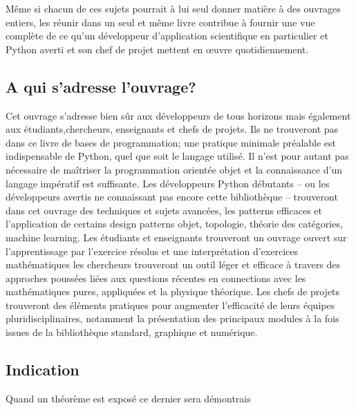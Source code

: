 Même si chacun de ces sujets pourrait à lui seul donner matière à des ouvrages entiers, les réunir dans 
un seul et même livre contribue à fournir une vue complète de ce qu’un développeur d'application 
scientifique en particulier et Python averti et son chef de projet mettent en œuvre quotidiennement.

\subsection*{A qui s'adresse l'ouvrage?}
Cet ouvrage s’adresse bien sûr aux développeurs de tous horizons mais également aux
étudiants,chercheurs, enseignants et chefs de projets. Ils ne trouveront pas dans ce livre de bases de 
programmation; une pratique minimale préalable est indispensable de Python, quel que soit le langage 
utilisé. Il n’est pour autant pas nécessaire de maîtriser la programmation orientée objet et 
la connaissance d’un langage impératif est suffisante.
Les développeurs Python débutants – ou les développeurs avertis ne connaissant pas
encore cette bibliothèque – trouveront dans cet ouvrage des techniques et sujets avancées, les patterns 
efficaces et l’application de certains design patterns objet, topologie, théorie des catégories, machine
learning.
Les étudiants et enseignants trouveront un ouvrage ouvert sur l'apprentissage par l'exercice résolus et 
une interprétation d’exercices mathématiques  
les chercheurs trouveront un outil léger et efficace à travers des approches poussées liées aux 
questions récentes en connections avec les mathématiques pures, appliquées et la physique théorique.
Les chefs de projets trouveront des éléments pratiques pour augmenter l’efficacité de
leurs équipes pluridisciplinaires, notamment la présentation des principaux modules à la fois issues de la bibliothèque standard, graphique et numérique.
\subsection*{Indication}
Quand un théorème est exposé ce dernier sera démontrais